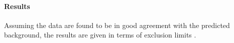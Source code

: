 \paragraph{Results}
\label{sec:result}

Assuming the data are found to be in good agreement with the predicted background, the results 
are given in terms of exclusion limits \cite{CLs_2002}. 




